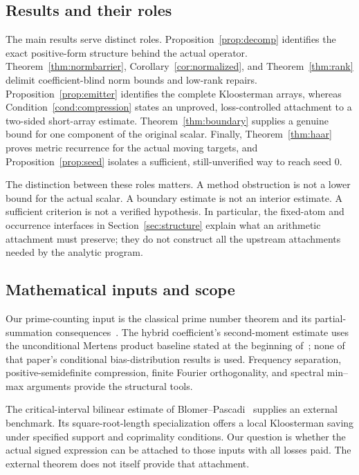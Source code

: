 \subsection{Results and their roles}
The main results serve distinct roles. Proposition~\ref{prop:decomp} identifies the exact positive-form structure behind the actual operator. Theorem~\ref{thm:normbarrier}, Corollary~\ref{cor:normalized}, and Theorem~\ref{thm:rank} delimit coefficient-blind norm bounds and low-rank repairs. Proposition~\ref{prop:emitter} identifies the complete Kloosterman arrays, whereas Condition~\ref{cond:compression} states an unproved, loss-controlled attachment to a two-sided short-array estimate. Theorem~\ref{thm:boundary} supplies a genuine bound for one component of the original scalar. Finally, Theorem~\ref{thm:haar} proves metric recurrence for the actual moving targets, and Proposition~\ref{prop:seed} isolates a sufficient, still-unverified way to reach seed $0$.

The distinction between these roles matters. A method obstruction is not a lower bound for the actual scalar. A boundary estimate is not an interior estimate. A sufficient criterion is not a verified hypothesis. In particular, the fixed-atom and occurrence interfaces in Section~\ref{sec:structure} explain what an arithmetic attachment must preserve; they do not construct all the upstream attachments needed by the analytic program.

\subsection{Mathematical inputs and scope}
Our prime-counting input is the classical prime number theorem and its partial-summation consequences~\cite{selberg1949}. The hybrid coefficient's second-moment estimate uses the unconditional Mertens product baseline stated at the beginning of~\cite{lamzouri2015}; none of that paper's conditional bias-distribution results is used. Frequency separation, positive-semidefinite compression, finite Fourier orthogonality, and spectral min--max arguments provide the structural tools.

The critical-interval bilinear estimate of Blomer--Pascadi~\cite{blomer2026} supplies an external benchmark. Its square-root-length specialization offers a local Kloosterman saving under specified support and coprimality conditions. Our question is whether the actual signed expression can be attached to those inputs with all losses paid. The external theorem does not itself provide that attachment.

